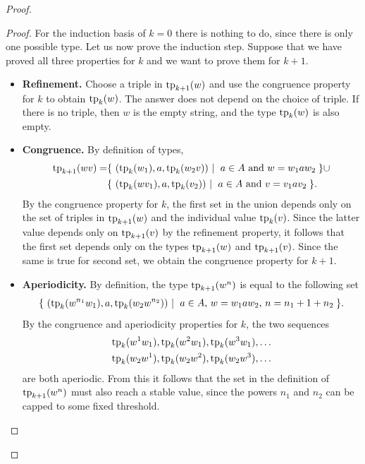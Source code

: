 \begin{proof}
    \begin{proof}
        For the induction basis of $k=0$ there is nothing to do, since there is only one possible type. Let us now prove the induction step. 
        Suppose that we have proved all three properties for $k$ and we want to prove them for $k+1$.
        \begin{itemize}
            \item \textbf{Refinement.} Choose a  triple  in $ \text{tp}_{k+1}(w)$ and use the congruence property for $k$ to obtain  $\text{tp}_{k}(w)$.  The answer does not depend on the choice of triple. If there is no triple, then $w$ is the empty string, and the type $\text{tp}_{k}(w)$ is also empty.
            \item \textbf{Congruence.} By definition of types, 
        \begin{align*}
\fotype_{k+1}(wv) = &      \setbuild{ (\fotype_{k}(w_1), a, \fotype_{k}(w_2v))}{$a \in A$ and $w = w_1 a w_2$}   \cup \\ 
     &    \setbuild{ (\fotype_{k}(wv_1), a, \fotype_{k}(v_2))}{$a \in A$ and $v = v_1 a v_2$}.
        \end{align*}
    By the congruence property for $k$, the first set in the union depends only on the set of triples in $\text{tp}_{k+1}(w)$ and the individual value $\text{tp}_{k}(v)$. Since the latter value depends only on $\text{tp}_{k+1}(v)$ by the refinement property, it follows that the first set depends only on the types $\text{tp}_{k+1}(w)$ and $\text{tp}_{k+1}(v)$. Since the same is true for  second set, we obtain the congruence property for $k+1$.
    \item \textbf{Aperiodicity.} By definition, the type  $\text{tp}_{k+1}(w^n)$ is equal to the following set
    \begin{align*}
    \setbuild{ (\fotype_k(w^{n_1} w_1), a, \fotype_k(w_2 w^{n_2}))}{$a \in A$, $w = w_1 a w_2$, $n = n_1 + 1 + n_2$}.
    \end{align*}
    By the congruence and aperiodicity properties for $k$, the two sequences 
    \begin{align*}
    \text{tp}_k(w^{1} w_1), \text{tp}_k(w^{2} w_1), \text{tp}_k(w^{3} w_1), \ldots \\
    \text{tp}_k(w_2 w^{1}), \text{tp}_k(w_2 w^{2}), \text{tp}_k(w_2 w^{3}), \ldots
    \end{align*}
    are both aperiodic. From this it follows that the set in the definition of $\text{tp}_{k+1}(w^n)$ must also reach a stable value, since the powers $n_1$ and $n_2$ can be capped to some fixed threshold.  
        \end{itemize}


\end{proof}
\end{proof}
